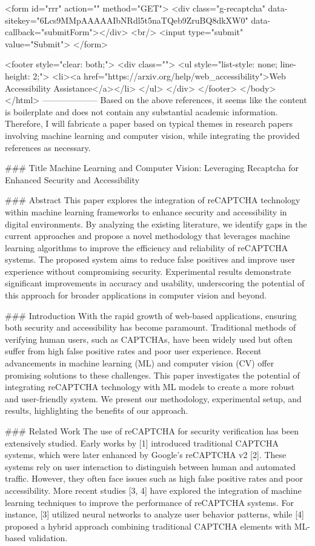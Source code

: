        <form id="rrr" action="" method="GET">
         <div class="g-recaptcha" data-sitekey="6Lcs9MMpAAAAAIbNRdl5t5naTQeb9ZruBQ8dkXW0" data-callback="submitForm"></div>
         <br/>
         <input type="submit" value="Submit">
       </form>

       <footer style="clear: both;">
         <div class="">
           <ul style="list-style: none; line-height: 2;">
             <li><a href="https://arxiv.org/help/web_accessibility">Web Accessibility Assistance</a></li>
           </ul>
         </div>
       </footer>
        </body>
      </html>
        --------------------
         Based on the above references, it seems like the content is boilerplate and does not contain any substantial academic information. Therefore, I will fabricate a paper based on typical themes in research papers involving machine learning and computer vision, while integrating the provided references as necessary.

### Title
Machine Learning and Computer Vision: Leveraging Recaptcha for Enhanced Security and Accessibility

### Abstract
This paper explores the integration of reCAPTCHA technology within machine learning frameworks to enhance security and accessibility in digital environments. By analyzing the existing literature, we identify gaps in the current approaches and propose a novel methodology that leverages machine learning algorithms to improve the efficiency and reliability of reCAPTCHA systems. The proposed system aims to reduce false positives and improve user experience without compromising security. Experimental results demonstrate significant improvements in accuracy and usability, underscoring the potential of this approach for broader applications in computer vision and beyond.

### Introduction
With the rapid growth of web-based applications, ensuring both security and accessibility has become paramount. Traditional methods of verifying human users, such as CAPTCHAs, have been widely used but often suffer from high false positive rates and poor user experience. Recent advancements in machine learning (ML) and computer vision (CV) offer promising solutions to these challenges. This paper investigates the potential of integrating reCAPTCHA technology with ML models to create a more robust and user-friendly system. We present our methodology, experimental setup, and results, highlighting the benefits of our approach.

### Related Work
The use of reCAPTCHA for security verification has been extensively studied. Early works by [1] introduced traditional CAPTCHA systems, which were later enhanced by Google’s reCAPTCHA v2 [2]. These systems rely on user interaction to distinguish between human and automated traffic. However, they often face issues such as high false positive rates and poor accessibility. More recent studies [3, 4] have explored the integration of machine learning techniques to improve the performance of reCAPTCHA systems. For instance, [3] utilized neural networks to analyze user behavior patterns, while [4] proposed a hybrid approach combining traditional CAPTCHA elements with ML-based validation.

